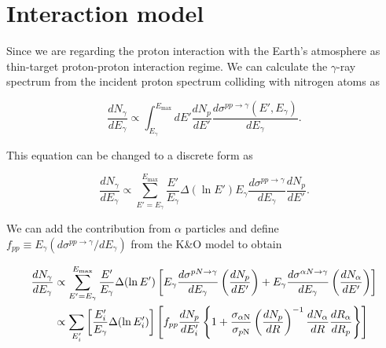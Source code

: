 \chapter{Interaction model}
\label{appendix:interaction_model}

Since we are regarding the proton interaction with the Earth's atmosphere 
as thin-target proton-proton interaction regime.
We can calculate the $\gamma$-ray spectrum
from the incident proton spectrum colliding with nitrogen atoms as

\begin{equation}
    \frac{dN_\gamma}{dE_\gamma} \propto \int^{E_{\text{max}}}_{E_\gamma} dE'\frac{dN_p}{dE'} \frac{d\sigma^{pp\rightarrow\gamma}(E',E_\gamma)}{dE_\gamma}.
\end{equation}

This equation can be changed to a discrete form as

\begin{equation}
    \frac{dN_\gamma}{dE_\gamma} \propto \sum_{E'=E_\gamma}^{E_\text{max}} \frac{E'}{E_\gamma}\Delta(\ln E')E_\gamma\frac{d\sigma^{pp\rightarrow\gamma}}{dE_\gamma}\frac{dN_p}{dE'}.
\end{equation}

We can add the contribution from $\alpha$ particles and define
$f_{pp}\equiv E_\gamma(d\sigma^{pp\rightarrow\gamma}/dE_\gamma)$
from the K\&O model \citep{K&Omodel} to obtain

\begin{equation}
\begin{split}
    \frac{dN_\gamma}{dE_\gamma} &\propto \sum_{E'=E_\gamma}^{E_\text{max}}\frac{E'}{E_\gamma}\Delta(\ln E')\left[ E_\gamma\frac{d\sigma^{pN\rightarrow\gamma}}{dE_\gamma}\left(\frac{dN_p}{dE'}\right) + E_\gamma\frac{d\sigma^{\alpha N\rightarrow\gamma}}{dE_\gamma}\left(\frac{dN_\alpha}{dE'}\right) \right] \\
    &\propto 
    \sum_{E'_i}\left[\frac{E'_i}{E_{\gamma}}\Delta(\ln E'_i) \right]
    \left[ 
        f_{pp}\frac{dN_p}{dE'_i}
        \left\{
            1+\frac{\sigma_{\alpha\rm N}}{\sigma_{p\rm N}}\left(\frac{dN_p}{dR}\right)^{-1} \frac{dN_{\alpha}}{dR} \frac{dR_{\alpha}}{dR_p} 
        \right\}
    \right]
\end{split}
\end{equation}

